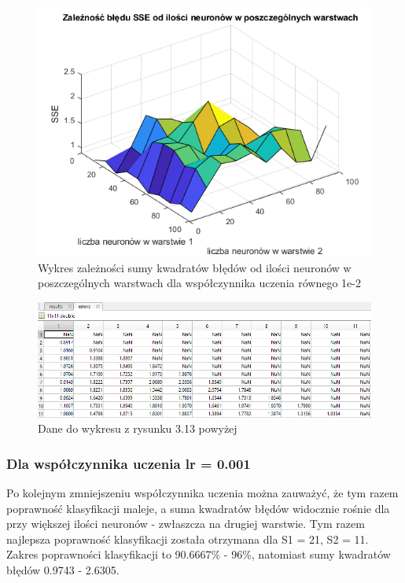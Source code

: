 \documentclass[a4paper, 12pt]{article}
\begin{document}
\clearpage

\begin{figure}[ht]
	\centering
	\includegraphics[width=12cm]{images/lr2 sse}
	\caption{Wykres zależności sumy kwadratów błędów od ilości neuronów w poszczególnych warstwach dla współczynnika uczenia równego 1e-2}
\label{Fig:lr1 sse}
\end{figure}

\begin{figure}[ht]
	\centering
	\includegraphics[width=12cm]{images/lr2 sse dane}
	\caption{Dane do wykresu z rysunku 3.13 powyżej}
\label{Fig:lr1 sse dane}
\end{figure}

\clearpage
  

\newpage
\subsubsection{Dla współczynnika uczenia lr = 0.001}
Po kolejnym zmniejszeniu współczynnika uczenia można zauważyć, że tym razem poprawność klasyfikacji maleje, a suma kwadratów błędów widocznie rośnie dla przy większej ilości neuronów - zwłaszcza na drugiej warstwie. Tym razem najlepsza poprawność klasyfikacji została otrzymana dla S1 = 21, S2 = 11. Zakres poprawności klasyfikacji to 90.6667\% - 96\%, natomiast sumy kwadratów błędów 0.9743 - 2.6305.
\end{document}
